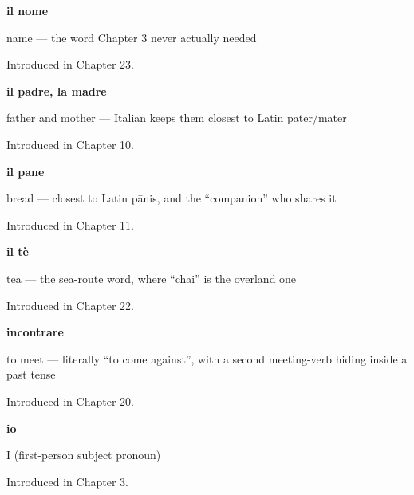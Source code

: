 \noindent\begin{minipage}[t]{\linewidth}
\raggedright
\textbf{il nome}\par
\small name — the word Chapter 3 never actually needed\par
\footnotesize Introduced in Chapter 23.
\end{minipage}\par\medskip

\noindent\begin{minipage}[t]{\linewidth}
\raggedright
\textbf{il padre, la madre}\par
\small father and mother — Italian keeps them closest to Latin pater/mater\par
\footnotesize Introduced in Chapter 10.
\end{minipage}\par\medskip

\noindent\begin{minipage}[t]{\linewidth}
\raggedright
\textbf{il pane}\par
\small bread — closest to Latin pānis, and the \textquotedblleft{}companion\textquotedblright{} who shares it\par
\footnotesize Introduced in Chapter 11.
\end{minipage}\par\medskip

\noindent\begin{minipage}[t]{\linewidth}
\raggedright
\textbf{il tè}\par
\small tea — the sea-route word, where \textquotedblleft{}chai\textquotedblright{} is the overland one\par
\footnotesize Introduced in Chapter 22.
\end{minipage}\par\medskip

\noindent\begin{minipage}[t]{\linewidth}
\raggedright
\textbf{incontrare}\par
\small to meet — literally \textquotedblleft{}to come against\textquotedblright{}, with a second meeting-verb hiding inside a past tense\par
\footnotesize Introduced in Chapter 20.
\end{minipage}\par\medskip

\noindent\begin{minipage}[t]{\linewidth}
\raggedright
\textbf{io}\par
\small I (first-person subject pronoun)\par
\footnotesize Introduced in Chapter 3.
\end{minipage}\par\medskip


